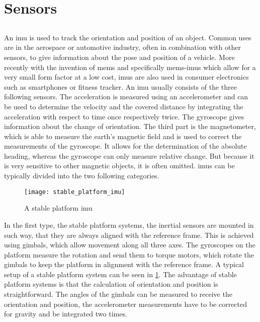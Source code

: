 \section{Sensors}
\subsection{}
An \gls{imu} is used to track the orientation and position of an object.
Common uses are in the aerospace or automotive industry, often in combination with other sensors, to give information about the pose and position of a vehicle.
More recently with the invention of \gls{mems} and specifically \gls{mems}-\gls{imu}s which allow for a very small form factor at a low cost, \gls{imu}s are also used in consumer electronics such as smartphones or fitness tracker.
An \gls{imu} usually consists of the three following sensors.
The acceleration is measured using an accelerometer and can be used to determine the velocity and the covered distance by integrating the acceleration with respect to time once respectively twice.
The gyroscope gives information about the change of orientation.
The third part is the magnetometer, which is able to measure the earth's magnetic field and is used to correct the measurements of the gyroscope.
It allows for the determination of the absolute heading, whereas the gyroscope can only measure relative change. But because it is very sensitive to other magnetic objects, it is often omitted.
\gls{imu}s can be typically divided into the two following categories.\\
\begin{figure}[htbp]
    \centering
    \texttt{[image: stable\_platform\_imu]}
    \caption{A stable platform \acrshort{imu} \cite{Woodman2007}}
    \label{fig:stable_platform_imu}
\end{figure}
In the first type, the stable platform systems, the inertial sensors are mounted in such way, that they are always aligned with the reference frame.
This is achieved using gimbals, which allow movement along all three axes.
The gyroscopes on the platform measure the rotation and send them to torque motors, which rotate the gimbals to keep the platform in alignment with the reference frame.
A typical setup of a stable platform system can be seen in \cref{fig:stable_platform_imu}.
The advantage of stable platform systems is that the calculation of orientation and position is straightforward.
The angles of the gimbals can be measured to receive the orientation and position, the accelerometer measurements have to be corrected for gravity and be integrated two times.
